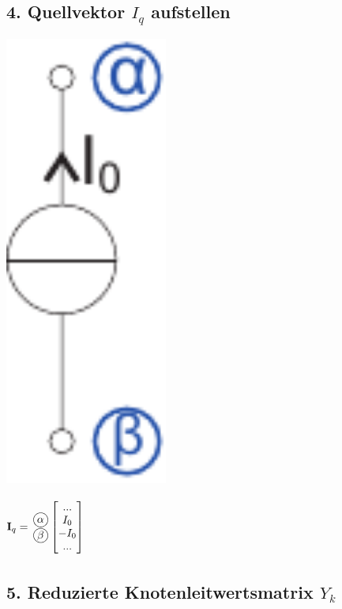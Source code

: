 \documentclass[a4paper,twocolumn,10pt]{article}
\newcommand*\kreis[1]{\unitlength1ex\begin{picture}(2.5,2.5)%
\put(0.75,0.75){\circle{3}}\put(0.7,0.7){\makebox(0,0){#1}}\end{picture}}
\begin{document}
\subsection*{4. Quellvektor $I_q$ aufstellen}
\begin{minipage}[b]{0.10\textwidth}
\includegraphics[width=0.4\textwidth]{Grafiken/KSA_Stromquelle}
\end{minipage}
\hfill
\begin{minipage}[b]{0.30\textwidth}
$\textbf{I}_q=\;\;\begin{matrix} \; \\ \kreis{$\alpha$} \\ \kreis{$\beta$} \\ \; \end{matrix} \left[\begin{matrix} ... \\ I_0 \\ -I_0 \\ ... \end{matrix}\right]$\\
\end{minipage}

\subsection*{5. Reduzierte Knotenleitwertsmatrix $Y_k$}
\end{document}
